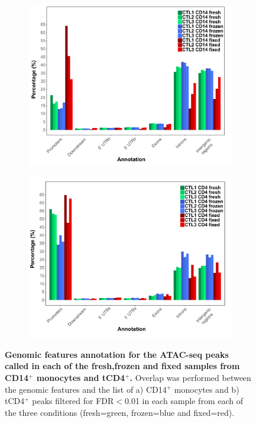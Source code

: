 \begin{figure}[htbp]
\centering
\begin{subfigure}{0.5\textwidth}
\centering
\includegraphics[width=\textwidth]{./Results1/pdfs/Core_ATAC_CD14_fresh_frozen_fixed_IDR_filtered_peak_annotation}
\caption{\textbf{}}
\end{subfigure}%
\begin{subfigure}{0.5\textwidth}
\centering
\includegraphics[width=\textwidth]{./Results1/pdfs/Core_ATAC_CD4_fresh_frozen_fixed_IDR_filtered_peak_annotation}
\caption{\textbf{}}
\end{subfigure}
\caption[Genomic features annotation for the ATAC-seq peaks called in each of the fresh,frozen and fixed samples from CD14$^+$ monocytes and total CD4$^+$.]{\textbf{Genomic features annotation for the ATAC-seq peaks called in each of the fresh,frozen and fixed samples from CD14$^+$ monocytes and tCD4$^+$.} Overlap was performed between the genomic features and the list of a) CD14$^+$ monocytes and b) tCD4$^+$ peaks filtered for FDR$<$0.01 in each sample from each of the three conditions (fresh=green, frozen=blue and fixed=red).}
\label{figure:Core_ATAC_all_conditions_genomic_features}
\end{figure} 


